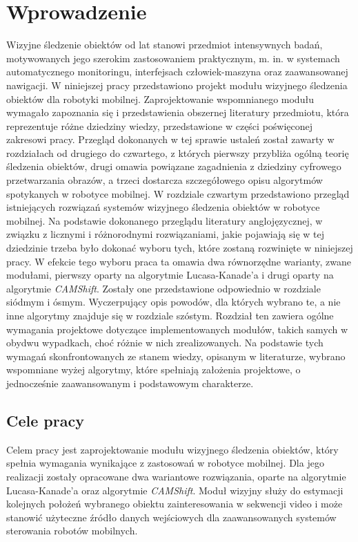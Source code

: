 \chapter{Wprowadzenie}
\label{cha:Wprowadzenie}

Wizyjne śledzenie obiektów od lat stanowi przedmiot intensywnych badań, motywowanych jego szerokim zastosowaniem praktycznym, m. in. w systemach automatycznego monitoringu, interfejsach człowiek-maszyna oraz zaawansowanej nawigacji. W niniejszej pracy przedstawiono projekt modułu wizyjnego śledzenia obiektów dla robotyki mobilnej. Zaprojektowanie wspomnianego modułu wymagało zapoznania się i przedstawienia obszernej literatury przedmiotu, która reprezentuje różne dziedziny wiedzy, przedstawione w części poświęconej zakresowi pracy. Przegląd dokonanych w tej sprawie ustaleń został zawarty w rozdziałach od drugiego do czwartego, z których pierwszy przybliża ogólną teorię śledzenia obiektów, drugi omawia powiązane zagadnienia z dziedziny cyfrowego przetwarzania obrazów, a trzeci dostarcza szczegółowego opisu algorytmów spotykanych w robotyce mobilnej. W rozdziale czwartym przedstawiono przegląd istniejących rozwiązań systemów wizyjnego śledzenia obiektów w robotyce mobilnej. Na podstawie dokonanego przeglądu literatury anglojęzycznej, w związku z licznymi i różnorodnymi rozwiązaniami, jakie pojawiają się w tej dziedzinie trzeba było dokonać wyboru tych, które zostaną rozwinięte w niniejszej pracy. W efekcie tego wyboru praca ta omawia dwa równorzędne warianty, zwane modułami, pierwszy oparty na algorytmie Lucasa-Kanade'a i drugi oparty na algorytmie \textit{CAMShift}. Zostały one przedstawione odpowiednio w rozdziale siódmym i ósmym. Wyczerpujący opis powodów, dla których wybrano te, a nie inne algorytmy znajduje się w rozdziale szóstym. Rozdział ten zawiera ogólne wymagania projektowe dotyczące implementowanych modułów, takich samych w obydwu wypadkach, choć różnie w nich zrealizowanych. Na podstawie tych wymagań skonfrontowanych ze stanem wiedzy, opisanym w literaturze, wybrano wspomniane wyżej algorytmy, które spełniają założenia projektowe, o jednocześnie zaawansowanym i podstawowym charakterze.

\section{Cele pracy}
\label{sec:Cele_pracy}

Celem pracy jest zaprojektowanie modułu wizyjnego śledzenia obiektów, który spełnia wymagania wynikające z zastosowań w robotyce mobilnej. Dla jego realizacji zostały opracowane dwa wariantowe rozwiązania, oparte na algorytmie Lucasa-Kanade'a oraz algorytmie \textit{CAMShift}. Moduł wizyjny służy do estymacji kolejnych położeń wybranego obiektu zainteresowania w sekwencji video i może stanowić użyteczne źródło danych wejściowych dla zaawansowanych systemów sterowania robotów mobilnych. 

